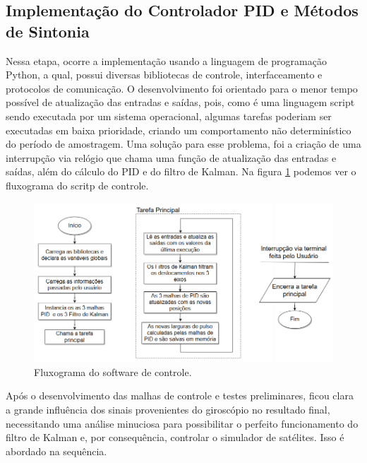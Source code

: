 
\subsection{Implementação do Controlador PID e Métodos de Sintonia}

Nessa etapa, ocorre a implementação usando a linguagem de programação Python, a qual, possui diversas bibliotecas de controle, interfaceamento e protocolos de comunicação. O desenvolvimento foi orientado para o menor tempo possível de atualização das entradas e saídas, pois, como é uma linguagem script sendo executada por um sistema operacional, algumas tarefas poderiam ser executadas em baixa prioridade, criando um comportamento não determinístico do período de amostragem. Uma solução para esse problema, foi a criação de uma interrupção via relógio que chama uma função de atualização das entradas e saídas, além do cálculo do PID e do filtro de Kalman. Na figura \ref{fig:software_model} podemos ver o fluxograma do scritp de controle.

\begin{figure}[H]
  \caption{Fluxograma do software de controle.}
  \begin{center}
      \includegraphics[scale=.65]{metodologia/img/software_model}
  \end{center}
  \label{fig:software_model}
\end{figure}

Após o desenvolvimento das malhas de controle e testes preliminares, ficou clara a grande influência dos sinais provenientes do giroscópio no resultado final, necessitando uma análise minuciosa para possibilitar o perfeito funcionamento do filtro de Kalman e, por consequência, controlar o simulador de satélites. Isso é abordado na sequência. 


